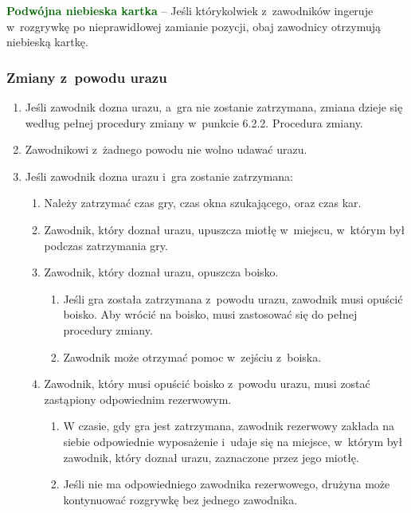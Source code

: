 \documentclass[12pt]{article}
\newcommand\other[1]{\bgroup\textcolor{darkgreen}{\textbf{#1}}}
\begin{document}
\other{Podwójna niebieska kartka} -- Jeśli którykolwiek z~zawodników
ingeruje w~rozgrywkę po nieprawidłowej zamianie pozycji, obaj zawodnicy
otrzymują niebieską kartkę.

\subsubsection{Zmiany z~powodu urazu}

\begin{enumerate}
	\item
	      Jeśli zawodnik dozna urazu, a~gra nie zostanie zatrzymana, zmiana
	      dzieje się według pełnej procedury zmiany w~punkcie 6.2.2. Procedura
	      zmiany.
	\item
	      Zawodnikowi z~żadnego powodu nie wolno udawać urazu.
	\item
	      Jeśli zawodnik dozna urazu i~gra zostanie zatrzymana:

	      \begin{enumerate}
		      \item
		            Należy zatrzymać czas gry, czas okna szukającego, oraz czas kar.
		      \item
		            Zawodnik, który doznał urazu, upuszcza miotłę w~miejscu, w~którym
		            był podczas zatrzymania gry.
		      \item
		            Zawodnik, który doznał urazu, opuszcza boisko.

		            \begin{enumerate}
			            \item
			                  Jeśli gra została zatrzymana z~powodu urazu, zawodnik musi opuścić
			                  boisko. Aby wrócić na boisko, musi zastosować się do pełnej
			                  procedury zmiany.
			            \item
			                  Zawodnik może otrzymać pomoc w~zejściu z~boiska.
		            \end{enumerate}
		      \item
		            Zawodnik, który musi opuścić boisko z~powodu urazu, musi zostać
		            zastąpiony odpowiednim rezerwowym.

		            \begin{enumerate}
			            \item
			                  W czasie, gdy gra jest zatrzymana, zawodnik rezerwowy zakłada na
			                  siebie odpowiednie wyposażenie i~udaje się na miejsce, w~którym
			                  był zawodnik, który doznał urazu, zaznaczone przez jego miotłę.
			            \item
			                  Jeśli nie ma odpowiedniego zawodnika rezerwowego, drużyna może
			                  kontynuować rozgrywkę bez jednego zawodnika.
		            \end{enumerate}
	      \end{enumerate}
\end{enumerate}
\end{document}
